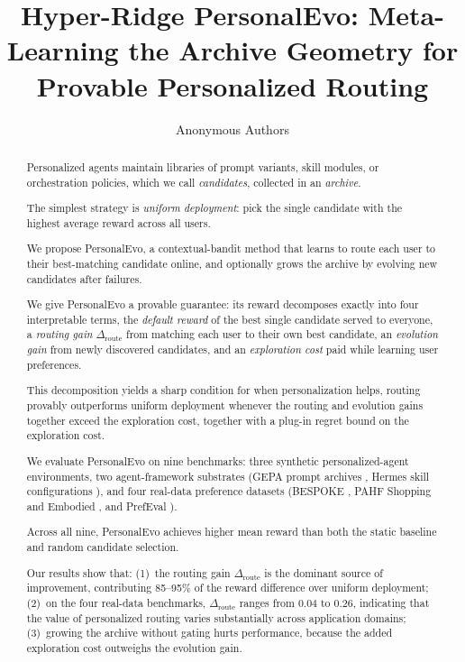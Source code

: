 \documentclass{article} %
\title{Hyper-Ridge PersonalEvo: Meta-Learning the Archive Geometry for Provable Personalized Routing}
\author{Anonymous Authors}
\begin{document}
\maketitle

\begin{abstract}
Personalized agents maintain libraries of prompt variants, skill modules, or orchestration policies, which we call \emph{candidates}, collected in an \emph{archive}.

The simplest strategy is \emph{uniform deployment}: pick the single candidate with the highest average reward across all users.

We propose PersonalEvo, a contextual-bandit method that learns to route each user to their best-matching candidate online, and optionally grows the archive by evolving new candidates after failures.

We give PersonalEvo a provable guarantee: its reward decomposes exactly into four interpretable terms, the \emph{default reward} of the best single candidate served to everyone, a \emph{routing gain} $\Delta_{\mathrm{route}}$ from matching each user to their own best candidate, an \emph{evolution gain} from newly discovered candidates, and an \emph{exploration cost} paid while learning user preferences.

This decomposition yields a sharp condition for when personalization helps, routing provably outperforms uniform deployment whenever the routing and evolution gains together exceed the exploration cost, together with a plug-in regret bound on the exploration cost.

We evaluate PersonalEvo on nine benchmarks: three synthetic personalized-agent environments, two agent-framework substrates (GEPA prompt archives \citep{agrawal2025geparp}, Hermes skill configurations \citep{hermes_selfevolution}), and four real-data preference datasets (BESPOKE \citep{jin2026personalizing}, PAHF Shopping and Embodied \citep{pahf2025}, and PrefEval \citep{zhao2025prefeval}).

Across all nine, PersonalEvo achieves higher mean reward than both the static baseline and random candidate selection.

Our results show that: (1)~the routing gain $\Delta_{\mathrm{route}}$ is the dominant source of improvement, contributing 85--95\% of the reward difference over uniform deployment; (2)~on the four real-data benchmarks, $\Delta_{\mathrm{route}}$ ranges from $0.04$ to $0.26$, indicating that the value of personalized routing varies substantially across application domains; (3)~growing the archive without gating hurts performance, because the added exploration cost outweighs the evolution gain.


\end{abstract}
\end{document}
